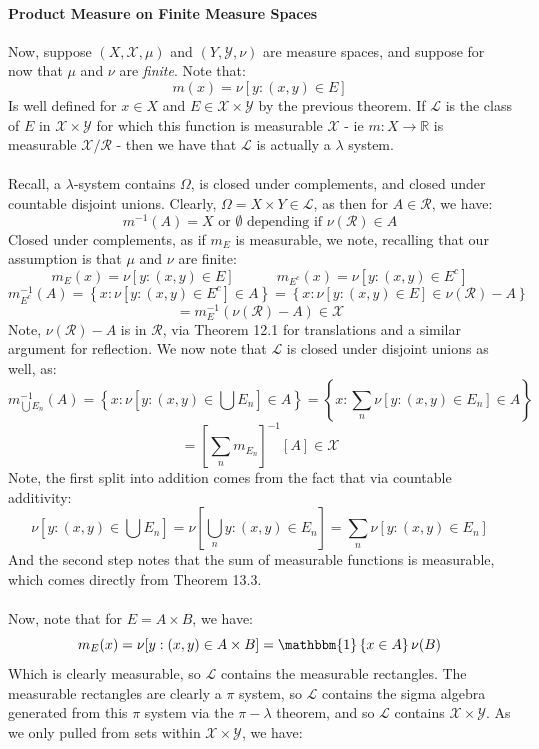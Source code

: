 \documentclass[12pt,a4paper]{article}
\newcommand{\1}[1]{\mathbbm{1}\left\{ #1 \right\}}
\newcommand{\R}{\mathbb{R}}
\newcommand{\lcal}{\mathcal{L}}
\newcommand{\rcal}{\mathcal{R}}
\newcommand{\xcal}{\mathcal{X}}
\newcommand{\ycal}{\mathcal{Y}}
\begin{document}
\paragraph{Product Measure on Finite Measure Spaces} Now, suppose $(X, \xcal, \mu)$ and $(Y, \ycal, \nu)$ are measure spaces, and suppose for now that $\mu$ and $\nu$ are \textit{finite}. Note that:
$$
	m(x) = \nu[y : (x,y) \in E]
$$
Is well defined for $x \in X$ and $E \in \xcal \times \ycal$ by the previous theorem. If $\lcal$ is the class of $E$ in $\xcal \times \ycal$ for which this function is measurable $\xcal$ - ie $m: X \to \R$ is measurable $\xcal/\rcal$ - then we have that $\lcal$ is actually a $\lambda$ system.
\\\\
Recall, a $\lambda$-system contains $\Omega$, is closed under complements, and closed under countable disjoint unions. Clearly, $\Omega = X \times Y \in \lcal$, as then for $A \in \rcal$, we have:
$$
	m^{-1}(A) = X \text{ or } \emptyset \text{ depending if $\nu(\rcal) \in A$}
$$
Closed under complements, as if $m_E$ is measurable, we note, recalling that our assumption is that $\mu$ and $\nu$ are finite:
$$
	m_E(x) = \nu[y : (x,y) \in E] \quad\quad\quad
	m_{E^c}(x) = \nu[y : (x,y) \in E^c]
$$
$$
	m_{E^c}^{-1}(A) =
	\left\{x : \nu[y : (x,y) \in E^c] \in A\right\} =
	\left\{x : \nu[y : (x,y) \in E] \in \nu(\rcal) - A\right\}
$$
$$
	=
	m_E^{-1}(\nu(\rcal) - A) \in \xcal
$$
Note, $\nu(\rcal) - A$ is in $\rcal$, via Theorem 12.1 for translations and a similar argument for reflection. We now note that $\lcal$ is closed under disjoint unions as well, as:
$$
	m_{\bigcup E_n}^{-1}(A) =
	\left\{x : \nu[y : (x,y) \in \bigcup E_n] \in A\right\} =
	\left\{x : \sum_n \nu[y : (x,y) \in E_n] \in A\right\}
$$
$$
	= \left[\sum_n m_{E_n}\right]^{-1}[A] \in \xcal
$$
Note, the first split into addition comes from the fact that via countable additivity:
$$
	\nu[y : (x,y) \in \bigcup E_n] =
	\nu\left[\bigcup_n y : (x,y) \in E_n\right] =
	\sum_n \nu[y : (x,y) \in E_n]
$$
And the second step notes that the sum of measurable functions is measurable, which comes directly from Theorem 13.3.
\\\\
Now, note that for $E = A \times B$, we have:
$$
	m_E(x) = \nu[y : (x,y) \in A \times B] = \1{x \in A}\nu(B)
$$
Which is clearly measurable, so $\lcal$ contains the measurable rectangles. The measurable rectangles are clearly a $\pi$ system, so $\lcal$ contains the sigma algebra generated from this $\pi$ system via the $\pi-\lambda$ theorem, and so $\lcal$ contains $\xcal \times \ycal$. As we only pulled from sets within $\xcal \times \ycal$, we have:
\end{document}
